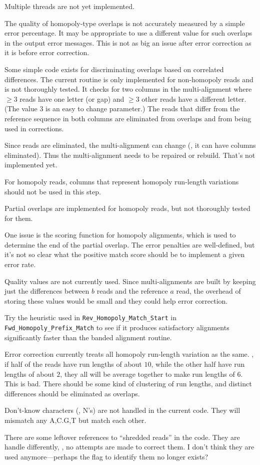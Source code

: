 \documentclass[letterpaper,11pt]{article}
\def\Pgm#1{\texttt{#1}}
\newenvironment{technotes}{\bq\small\bf\bi\exdent{Technical Notes:}}{\ei\eq}
\def\btn{\begin{technotes}}
\def\etn{\end{technotes}}
\begin{document}
\bn
\item
  Multiple threads are not yet implemented.
\item
  The quality of homopoly-type overlaps is not accurately measured
  by a simple error percentage.  It may be appropriate to use a
  different value for such overlaps in the output error messages.
  This is not as big an issue after error correction as it is before
  error correction.
\item
  Some simple code exists for discriminating overlaps based on
  correlated differences.  The current routine is only implemented for
  non-homopoly reads and is not thoroughly tested.  It checks for
  two columns in the multi-alignment where $\ge 3$ reads have one
  letter (or gap) and $\ge 3$ other reads have a different letter.
  (The value $3$ is an easy to change parameter.)  The reads that differ
  from the reference sequence in both columns are eliminated from
  overlaps and from being used in corrections.
  \btn
  \item
    Since reads are eliminated, the multi-alignment can change (\eg,
    it can have columns eliminated).  Thus the multi-alignment needs
    to be repaired or rebuild.  That's not implemented yet.
  \item
    For homopoly reads, columns that represent homopoly run-length
    variations should not be used in this step.
  \etn
\item
  Partial overlaps are implemented for homopoly reads, but not
  thoroughly tested for them.
  \btn
  \item
    One issue is the scoring function for homopoly alignments, which
    is used to determine the end of the partial overlap.  The error
    penalties are well-defined, but it's not so clear what the positive
    match score should be to implement a given error rate.
  \etn
\item
  Quality values are not currently used.  Since multi-alignments are built
  by keeping just the differences between $b$ reads and the reference
  $a$ read, the overhead of storing these values would be small and
  they could help error correction.
\item
  Try the heuristic used in \Pgm{Rev\_Homopoly\_Match\_Start} in
  \Pgm{Fwd\_Homopoly\_Prefix\_Match} to see if it produces satisfactory
  alignments significantly faster than the banded alignment routine.
\item
  Error correction currently treats all homopoly run-length variation
  as the same.  \Eg, if half of the reads have run lengths of about $10$,
  while the other half have run lengths of about $2$, they all will be
  average together to make run lengths of $6$.  This is bad.  There should
  be some kind of clustering of run lengths, and distinct differences
  should be eliminated as overlaps.
\item
  Don't-know characters (\ie, N's) are not handled in the current code.
  They will mismatch any A,C.G,T but match each other.
\item
  There are some leftover references to ``shredded reads'' in the code.
  They are handle differently, \eg, no attempts are made to correct them.
  I don't think they are used anymore---perhaps the flag to identify
  them no longer exists?
\en
\end{document}
